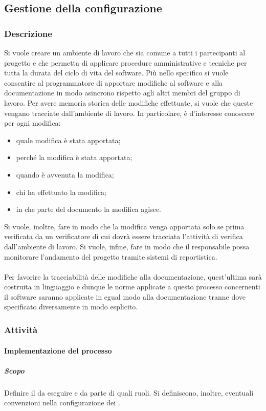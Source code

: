 \subsection{Gestione della configurazione}
    \subsubsection{Descrizione}
    Si vuole creare un ambiente di lavoro che sia comune a tutti i partecipanti al progetto e che permetta di applicare procedure amministrative e tecniche per tutta la durata del ciclo di vita del software. Più nello specifico si vuole consentire al programmatore di apportare modifiche al software e alla documentazione in modo asincrono rispetto agli altri membri del gruppo di lavoro. Per avere memoria storica delle modifiche effettuate, si vuole che queste vengano tracciate dall'ambiente di lavoro. In particolare, è d'interesse conoscere per ogni modifica:
    \begin{itemize}
        \item quale modifica è stata apportata;
        \item perché la modifica è stata apportata;
        \item quando è avvenuta la modifica;
        \item chi ha effettuato la modifica;
        \item in che parte del documento la modifica agisce.
    \end{itemize}
    Si vuole, inoltre, fare in modo che la modifica venga apportata solo se prima verificata da un verificatore di cui dovrà essere tracciata l'attività di verifica dall'ambiente di lavoro. Si vuole, infine, fare in modo che il responsabile possa monitorare l'andamento del progetto tramite sistemi di reportistica.
    \\\\
    Per favorire la tracciabilità delle modifiche alla documentazione, quest'ultima sarà costruita in linguaggio \glock{\LaTeX} e dunque le norme applicate a questo processo concernenti il software saranno applicate in egual modo alla documentazione tranne dove specificato diversamente in modo esplicito.

    \subsubsection{Attività}
        \paragraph{Implementazione del processo}
            \subparagraph{Scopo}
            Definire il  da eseguire e da parte di quali ruoli. Si definiscono, inoltre, eventuali convenzioni nella configurazione dei .

